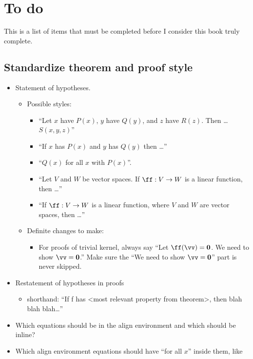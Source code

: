 \chapter*{To do}

This is a list of items that must be completed before I consider this book truly complete.

\section*{Standardize theorem and proof style}

\begin{itemize}
    \item Statement of hypotheses.
    \begin{itemize}
        \item Possible styles:
        \begin{itemize}
            \item “Let $x$ have $P(x)$, $y$ have $Q(y)$, and $z$ have $R(z)$. Then … $S(x, y, z)$”
            \item “If $x$ has $P(x)$ and $y$ has $Q(y)$ then …”
            \item “$Q(x)$ for all $x$ with $P(x)$”.
            \item “Let $V$ and $W$ be vector spaces. If $\ff:V \rightarrow W$ is a linear function, then …”
            \item “If $\ff:V \rightarrow W$ is a linear function, where $V$ and $W$ are vector spaces, then …”
        \end{itemize}
        \item Definite changes to make:
        \begin{itemize}
            \item For proofs of trivial kernel, always say ``Let $\ff(\vv) = \mathbf{0}$. We need to show $\vv = \mathbf{0}$.'' Make sure the ``We need to show $\vv = \mathbf{0}$'' part is never skipped.
        \end{itemize}
    \end{itemize}
    \item Restatement of hypotheses in proofs
    \begin{itemize}
        \item shorthand: “If f has <most relevant property from theorem>, then blah blah blah…” 
    \end{itemize}
    \item Which equations should be in the align environment and which should be inline?
    \item Which align environment equations should have ``for all $x$'' inside them, like


\end{itemize}
